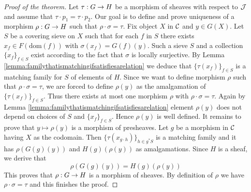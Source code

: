 \begin{proof}[Proof of the theorem]
Let $\tau:G\rightarrow H$ be a morphism of sheaves with respect to ${\mathcal J}$ and assume that $\tau\cdot p_1 = \tau \cdot p_2$. Our goal is to define and prove uniqueness of a morphism $\rho:G\rightarrow H$ such that $\rho\cdot \sigma = \tau$. Fix object $X$ in ${\mathcal C}$ and $y\in G(X)$. Let $S$ be a covering sieve on $X$ such that for each $f$ in $S$ there exists $x_f\in F(\mathrm{dom}(f))$ with $\sigma(x_f) = G(f)(y)$. Such a sieve $S$ and a collection $\{x_f\}_{f\in S}$ exist according to the fact that $\sigma$ is locally surjective. By Lemma \ref{lemma:familythatismatchingifsatisfiesarelation} we deduce that $\{\tau(x_f)\}_{f\in S}$ is a matching family for $S$ of elements of $H$. Since we want to define morphism $\rho$ such that $\rho\cdot \sigma =\tau$, we are forced to define $\rho(y)$ as the amalgamation of $\{\tau(x_f)\}_{f\in S}$. Thus there exists at most one morphism $\rho$ with $\rho\cdot \sigma =\tau$. Again by Lemma \ref{lemma:familythatismatchingifsatisfiesarelation} element $\rho(y)$ does not depend on choices of $S$ and $\{x_f\}_{f\in S}$. Hence $\rho(y)$ is well defined. It remains to prove that $y\mapsto \rho(y)$ is a morphism of presheaves. Let $g$ be a morphism in ${\mathcal C}$ having $X$ as the codomain. Then $\{\tau(x_{g\cdot h})\}_{h\in g^*S}$ is a matching family and it has $\rho\left(G(g)(y)\right)$ and $H(g)\left(\rho(y)\right)$ as amalgamations. Since $H$ is a sheaf, we derive that
$$\rho\left(G(g)(y)\right) = H(g)\left(\rho(y)\right)$$
This proves that $\rho:G\rightarrow H$ is a morphism of sheaves. By definition of $\rho$ we have $\rho\cdot \sigma = \tau$ and this finishes the proof.
\end{proof}




\small



